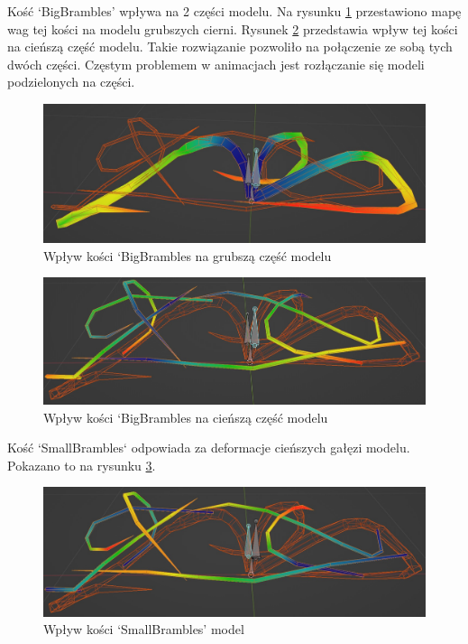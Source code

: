 \documentclass[12pt,twoside]{article}
\begin{document}
Kość `BigBrambles' wpływa na 2 części modelu. Na rysunku
\ref{Bramble:WeightsBigBigBrambles} przestawiono mapę wag tej kości na modelu
grubszych cierni. Rysunek \ref{Bramble:WeightsSmallBigBrambles} przedstawia
wpływ tej kości na cieńszą część modelu. Takie rozwiązanie pozwoliło na
połączenie ze sobą tych dwóch części. Częstym problemem w animacjach jest
rozłączanie się modeli podzielonych na części.

\begin{figure}[ht!]
    \centering
    \includegraphics[width=12cm]{RealizacjaProjektu/Thorns/bramble_weight_Big_BigBrambles.jpg}
    \caption{Wpływ kości `BigBrambles na grubszą część modelu}
    \label{Bramble:WeightsBigBigBrambles}
\end{figure}
\begin{figure}[ht!]
    \centering
    \includegraphics[width=12cm]{RealizacjaProjektu/Thorns/bramble_weight_Small_BigBrambles.jpg}
    \caption{Wpływ kości `BigBrambles na cieńszą część modelu}
    \label{Bramble:WeightsSmallBigBrambles}
\end{figure}

Kość `SmallBrambles` odpowiada za deformacje cieńszych gałęzi modelu. Pokazano
to na rysunku \ref{Bramble:WeightsSmallBrambles}.

\begin{figure}[ht!]
    \centering
    \includegraphics[width=12cm]{RealizacjaProjektu/Thorns/bramble_weight_SmallBrambles.jpg}
    \caption{Wpływ kości `SmallBrambles' model}
    \label{Bramble:WeightsSmallBrambles}
\end{figure}
\end{document}
